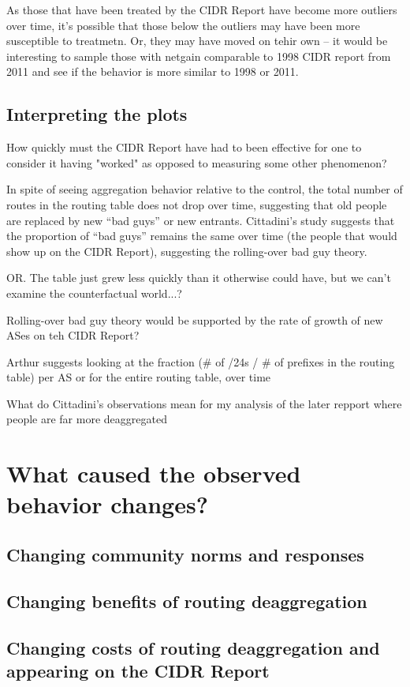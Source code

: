 As those that have been treated by the CIDR Report have become more outliers
over time, it's possible that those below the outliers may have been more
susceptible to treatmetn. Or, they may have moved on tehir own -- it would be
interesting to sample those with netgain comparable to 1998 CIDR report from
2011 and see if the behavior is more similar to 1998 or 2011.

\subsection{Interpreting the plots}

How quickly must the CIDR Report have had to been effective for one to consider
it having "worked" as opposed to measuring some other phenomenon?

In spite of seeing aggregation behavior relative to the control, the total
number of routes in the routing table does not drop over time, suggesting that
old people are replaced by new ``bad guys'' or new entrants. Cittadini's study
suggests that the proportion of ``bad guys'' remains the same over time (the
people that would show up on the CIDR Report), suggesting the rolling-over bad
guy theory.

OR. The table just grew less quickly than it otherwise could have, but we can't
examine the counterfactual world...?

Rolling-over bad guy theory would be supported by the rate of growth of new
ASes on teh CIDR Report?

Arthur suggests looking at the fraction (\# of /24s / \# of prefixes in the
routing table) per AS or for the entire routing table, over time

What do Cittadini's observations mean for my analysis of the later repport
where people are far more deaggregated

\section{What caused the observed behavior changes?}
\subsection{Changing community norms and responses}
\subsection{Changing benefits of routing deaggregation}
\subsection{Changing costs of routing deaggregation and
appearing on the CIDR Report}


